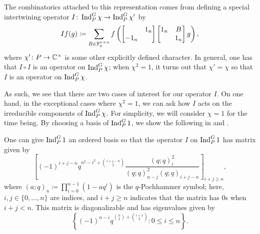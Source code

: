 \documentclass{amsart}
\begin{document}
The combinatorics attached to this representation comes from defining a special intertwining operator $I\colon\operatorname{Ind}_P^G\chi\to\operatorname{Ind}_P^G\chi'$ by
\[If(g)\coloneqq\sum_{B\in\mathbb F_q^{n\times n}}f\left(\begin{bmatrix}
    & 1_n \\ -1_n
\end{bmatrix}\begin{bmatrix}
    1_n & B \\ & 1_n
\end{bmatrix}g\right),\]
where $\chi'\colon P\to\mathbb C^\times$ is some other explicitly defined character. In general, one has that $I\circ I$ is an operator on $\operatorname{Ind}_P^G\chi$; when $\chi^2=1$, it turns out that $\chi'=\chi$ so that $I$ is an operator on $\operatorname{Ind}_P^G\chi$.

As such, we see that there are two cases of interest for our operator $I$. On one hand, in the exceptional cases where $\chi^2=1$, we can ask how $I$ acts on the irreducible components of $\operatorname{Ind}_P^G\chi$. For simplicity, we will consider $\chi=1$ for the time being. By choosing a basis of $\operatorname{Ind}_P^G1$, we show the following in  and .
\begin{theorem} \label{thm:sln-eigens}
    One can give $\operatorname{Ind}_P^G1$ an ordered basis so that the operator $I$ on $\operatorname{Ind}_P^G1$ has matrix given by
    \[\left[(-1)^{i+j-n}q^{n^2-i^2+\binom{i+j-n}2}\frac{(q;q)_i^2}{(q;q)_{n-j}^2(q;q)_{i+j-n}}\right]_{i+j\ge n},\]
    where $(a;q)_n\coloneqq\prod_{i=0}^{n-1}\left(1-aq^i\right)$ is the $q$-Pochhammer symbol; here, $i,j\in\{0,\ldots,n\}$ are indices, and $i+j\ge n$ indicates that the matrix has $0$s when $i+j< n$. This matrix is diagonalizable and has eigenvalues given by
    \[\left\{(-1)^{n-i}q^{\binom n2+\binom{i+1}2}:0\le i\le n\right\}.\]
\end{theorem}
\end{document}
